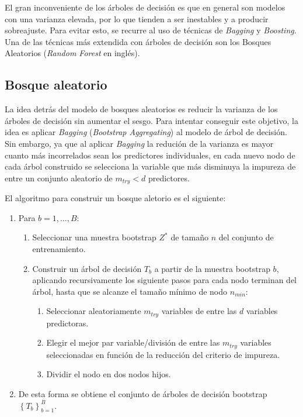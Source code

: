 \documentclass[12pt,a4paper,]{book}
\providecommand{\tightlist}{%
  \setlength{\itemsep}{0pt}\setlength{\parskip}{0pt}}
\numberwithin{dummy}{section}
\theoremstyle{ocrenumbox}
\theoremstyle{blacknumex}
\theoremstyle{blacknumbox}
\theoremstyle{ocrenum}
\theoremstyle{ocrenum}
\begin{document}
El gran inconveniente de los árboles de decisión es que en general son
modelos con una varianza elevada, por lo que tienden a ser inestables y
a producir sobreajuste. Para evitar esto, se recurre al uso de técnicas
de \emph{Bagging} y \emph{Boosting}. Una de las técnicas más extendida
con árboles de decisión son los Bosques Aleatorios (\emph{Random Forest}
en inglés).

\hypertarget{bosque-aleatorio}{%
\subsection{Bosque aleatorio}\label{bosque-aleatorio}}

La idea detrás del modelo de bosques aleatorios es reducir la varianza
de los árboles de decisión sin aumentar el sesgo. Para intentar
conseguir este objetivo, la idea es aplicar \emph{Bagging}
(\emph{Bootstrap Aggregating}) al modelo de árbol de decisión. Sin
embargo, ya que al aplicar \emph{Bagging} la redución de la varianza es
mayor cuanto más incorrelados sean los predictores individuales, en cada
nuevo nodo de cada árbol construido se selecciona la variable que más
disminuya la impureza de entre un conjunto aleatorio de \(m_{try} < d\)
predictores.

El algoritmo para construir un bosque aletorio es el siguiente:

\begin{enumerate}
\def\labelenumi{\arabic{enumi}.}
\item
  Para \(b = {1,...,B}:\)

  \begin{enumerate}
  \def\labelenumii{\alph{enumii})}
  \item
    Seleccionar una muestra bootstrap \(Z^*\) de tamaño \(n\) del
    conjunto de entrenamiento.
  \item
    Construir un árbol de decisión \(T_b\) a partir de la muestra
    bootstrap \(b\), aplicando recursivamente los siguiente pasos para
    cada nodo terminan del árbol, hasta que se alcanze el tamaño mínimo
    de nodo \(n_{min}:\)

    \begin{enumerate}
    \def\labelenumiii{\roman{enumiii}.}
    \tightlist
    \item
      Seleccionar aleatoriamente \(m_{try}\) variables de entre las
      \(d\) variables predictoras.
    \item
      Elegir el mejor par variable/división de entre las \(m_{try}\)
      variables seleccionadas en función de la reducción del criterio de
      impureza.
    \item
      Dividir el nodo en dos nodos hijos.
    \end{enumerate}
  \end{enumerate}
\item
  De esta forma se obtiene el conjunto de árboles de decisión bootstrap
  \(\left\{ T_b \right\}_{b=1}^B\).
\end{enumerate}
\end{document}
